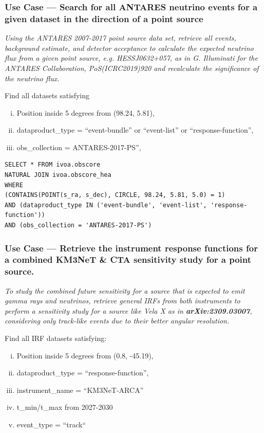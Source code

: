 \subsubsection{Use Case --- Search for all ANTARES neutrino events for a given dataset in the direction of a point source}

{\em Using the ANTARES 2007-2017 point source data set, retrieve all events, background estimate, and detector acceptance to calculate the expected neutrino flux from a given point source, e.g. HESSJ0632+057, as in \textit{G. Illuminati for the ANTARES Collaboration, PoS(ICRC2019)920} and recalculate the significance of the neutrino flux.}

\medskip
\noindent Find all datasets satisfying
\begin{enumerate}[(i)]
  \item Position inside 5 degrees from (98.24, 5.81),  
  \item dataproduct\_type = ``event-bundle'' or ``event-list'' or ``response-function'', 
  \item obs\_collection = ANTARES-2017-PS'',
\end{enumerate}

\begin{verbatim}
SELECT * FROM ivoa.obscore
NATURAL JOIN ivoa.obscore_hea
WHERE
(CONTAINS(POINT(s_ra, s_dec), CIRCLE, 98.24, 5.81, 5.0) = 1)
AND (dataproduct_type IN ('event-bundle', 'event-list', 'response-function'))
AND (obs_collection = 'ANTARES-2017-PS')
\end{verbatim}

\subsubsection{Use Case --- Retrieve the instrument response functions for a combined KM3NeT \& CTA sensitivity study for a point source.}

{\em To study the combined future sensitivity for a source that is expected to emit gamma rays and neutrinos, retrieve general IRFs from both instruments to perform a sensitivity study for a source like Vela X as in \textbf{arXiv:2309.03007}, considering only track-like events due to their better angular resolution.}

\medskip
\noindent Find all IRF datasets satisfying:
\begin{enumerate}[(i)]
  \item Position inside 5 degrees from (0.8, -45.19),
  \item dataproduct\_type = ``response-function'', 
  \item instrument\_name = ``KM3NeT-ARCA''
  \item t\_min/t\_max from 2027-2030
  \item event\_type = ``track``
\end{enumerate}

